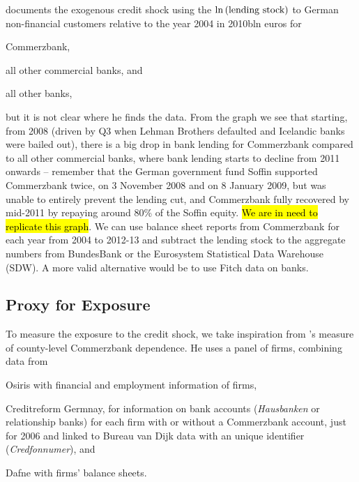 \documentclass[11pt]{article}
\begin{document}
\citet{bib:huber2018} documents the exogenous credit shock using the $\ln\left( \text{lending stock} \right)$ to German non-financial customers relative to the year 2004 in 2010bln euros for
\begin{inlinelist}
    \item Commerzbank,
    \item all other commercial banks, and
    \item all other banks,
\end{inlinelist}
but it is not clear where he finds the data. From the graph we see that starting, from 2008 (driven by Q3 when Lehman Brothers defaulted and Icelandic banks were bailed out), there is a big drop in bank lending for Commerzbank compared to all other commercial banks, where bank lending starts to decline from 2011 onwards -- remember that the German government fund Soffin supported Commerzbank twice, on 3 November 2008 and on 8 January 2009, but was unable to entirely prevent the lending cut, and Commerzbank fully recovered by mid-2011 by repaying around 80\% of the Soffin equity. \hl{We are in need to replicate this graph}. We can use balance sheet reports from Commerzbank for each year from 2004 to 2012-13 and subtract the lending stock to the aggregate numbers from BundesBank or the Eurosystem Statistical Data Warehouse (SDW). A more valid alternative would be to use Fitch data on banks.\\


\subsection{Proxy for Exposure}\label{sec:cbkdependence}

To measure the exposure to the credit shock, we take inspiration from \citet{bib:huber2018}'s measure of county-level Commerzbank dependence. He uses a panel of firms, combining data from
\begin{inlinelist}
    \item Osiris with financial and employment information of firms,
    \item Creditreform Germnay, for information on bank accounts (\textit{Hausbanken} or relationship banks) for each firm with or without a Commerzbank account, just for 2006 and linked to Bureau van Dijk data with an unique identifier (\textit{Credfonnumer}), and
    \item Dafne with firms' balance sheets.
\end{inlinelist}
\end{document}
